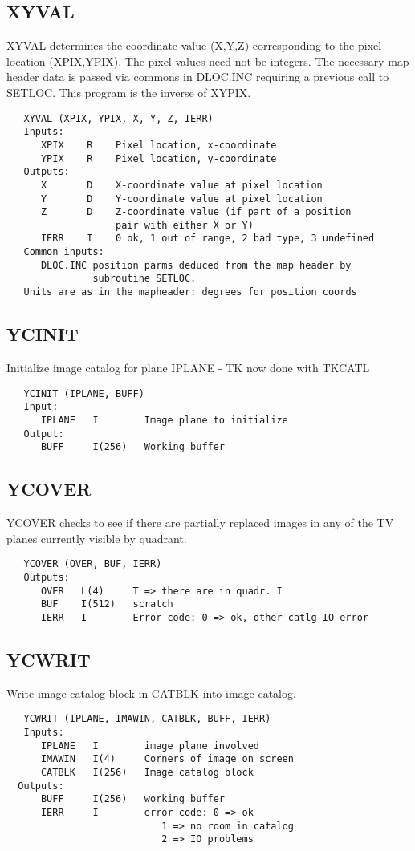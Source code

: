 \subsection{XYVAL}
XYVAL determines the coordinate value (X,Y,Z) corresponding to the
pixel location (XPIX,YPIX).  The pixel values need not be integers.
The necessary map header data is passed via commons in DLOC.INC
requiring a previous call to SETLOC. This program is the inverse of
XYPIX.
\begin{verbatim}
   XYVAL (XPIX, YPIX, X, Y, Z, IERR)
   Inputs:
      XPIX    R    Pixel location, x-coordinate
      YPIX    R    Pixel location, y-coordinate
   Outputs:
      X       D    X-coordinate value at pixel location
      Y       D    Y-coordinate value at pixel location
      Z       D    Z-coordinate value (if part of a position
                   pair with either X or Y)
      IERR    I    0 ok, 1 out of range, 2 bad type, 3 undefined
   Common inputs:
      DLOC.INC position parms deduced from the map header by
               subroutine SETLOC.
   Units are as in the mapheader: degrees for position coords
\end{verbatim}

\subsection{YCINIT}
Initialize image catalog for plane IPLANE - TK now done with TKCATL
\begin{verbatim}
   YCINIT (IPLANE, BUFF)
   Input:
      IPLANE   I        Image plane to initialize
   Output:
      BUFF     I(256)   Working buffer

\end{verbatim}

\subsection{YCOVER}
YCOVER checks to see if there are partially replaced images in any
of the TV planes currently visible by quadrant.
\begin{verbatim}
   YCOVER (OVER, BUF, IERR)
   Outputs:
      OVER   L(4)     T => there are in quadr. I
      BUF    I(512)   scratch
      IERR   I        Error code: 0 => ok, other catlg IO error

\end{verbatim}

\subsection{YCWRIT}
Write image catalog block in CATBLK into image catalog.
\begin{verbatim}
   YCWRIT (IPLANE, IMAWIN, CATBLK, BUFF, IERR)
   Inputs:
      IPLANE   I        image plane involved
      IMAWIN   I(4)     Corners of image on screen
      CATBLK   I(256)   Image catalog block
  Outputs:
      BUFF     I(256)   working buffer
      IERR     I        error code: 0 => ok
                           1 => no room in catalog
                           2 => IO problems

\end{verbatim}

